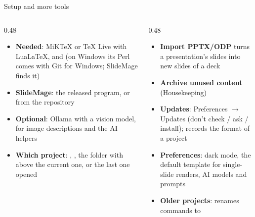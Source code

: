 
\begin{standardframe}{Setup and more tools}
	\begin{columns}[T,onlytextwidth]
		\begin{column}{0.48\linewidth}
			\begin{itemize}
				\item \textbf{Needed}: MiKTeX or TeX Live with LuaLaTeX,  and  (on Windows its Perl comes with Git for Windows; SlideMage finds it)
				\item \textbf{SlideMage}: the released program, or  from the repository
				\item \textbf{Optional}: Ollama with a vision model, for image descriptions and the AI helpers
				\item \textbf{Which project}: , , the folder with  above the current one, or the last one opened
			\end{itemize}
		\end{column}
		\begin{column}{0.48\linewidth}
			\begin{itemize}
				\item \textbf{Import PPTX/ODP} turns a presentation's slides into new slides of a deck
				\item \textbf{Archive unused content} (Housekeeping)
				\item \textbf{Updates}: Preferences $\rightarrow$ Updates (don't check / ask / install);  records the format of a project
				\item \textbf{Preferences}: dark mode, the default template for single-slide renders, AI models and prompts
				\item \textbf{Older projects}:  renames  commands to 
			\end{itemize}
		\end{column}
	\end{columns}
\end{standardframe}
